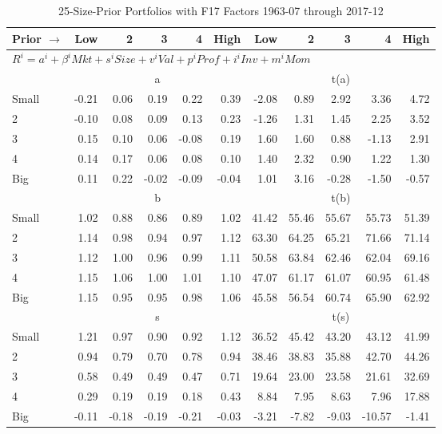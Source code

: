 
\begin{table}[!ht]
\footnotesize
\centering
\caption{25-Size-Prior Portfolios with F17 Factors 1963-07 through 2017-12}
\begin{tabular}{lrrrrrrrrrr}
  \toprule
    
    Prior $\rightarrow$ & Low & 2 & 3 & 4 & High & Low & 2 & 3 & 4 & High  \\ 
  \midrule
  \multicolumn{11}{l}{$R^i=a^i+\beta^iMkt+s^iSize+v^iVal+p^iProf+i^iInv+m^iMom$}  \\
  
     & \multicolumn{5}{c}{a} & \multicolumn{5}{c}{t(a)}   \\
     \cmidrule(r){2-6} \cmidrule(r){7-11} 
    Small  & -0.21  & 0.06  & 0.19  & 0.22  & 0.39  & -2.08  & 0.89  & 2.92  & 3.36  & 4.72   \\
    2  & -0.10  & 0.08  & 0.09  & 0.13  & 0.23  & -1.26  & 1.31  & 1.45  & 2.25  & 3.52   \\
    3  & 0.15  & 0.10  & 0.06  & -0.08  & 0.19  & 1.60  & 1.60  & 0.88  & -1.13  & 2.91   \\
    4  & 0.14  & 0.17  & 0.06  & 0.08  & 0.10  & 1.40  & 2.32  & 0.90  & 1.22  & 1.30   \\
    Big  & 0.11  & 0.22  & -0.02  & -0.09  & -0.04  & 1.01  & 3.16  & -0.28  & -1.50  & -0.57   \\
    
  
     & \multicolumn{5}{c}{b} & \multicolumn{5}{c}{t(b)}   \\
     \cmidrule(r){2-6} \cmidrule(r){7-11} 
    Small  & 1.02  & 0.88  & 0.86  & 0.89  & 1.02  & 41.42  & 55.46  & 55.67  & 55.73  & 51.39   \\
    2  & 1.14  & 0.98  & 0.94  & 0.97  & 1.12  & 63.30  & 64.25  & 65.21  & 71.66  & 71.14   \\
    3  & 1.12  & 1.00  & 0.96  & 0.99  & 1.11  & 50.58  & 63.84  & 62.46  & 62.04  & 69.16   \\
    4  & 1.15  & 1.06  & 1.00  & 1.01  & 1.10  & 47.07  & 61.17  & 61.07  & 60.95  & 61.48   \\
    Big  & 1.15  & 0.95  & 0.95  & 0.98  & 1.06  & 45.58  & 56.54  & 60.74  & 65.90  & 62.92   \\
    
  
     & \multicolumn{5}{c}{s} & \multicolumn{5}{c}{t(s)}   \\
     \cmidrule(r){2-6} \cmidrule(r){7-11} 
    Small  & 1.21  & 0.97  & 0.90  & 0.92  & 1.12  & 36.52  & 45.42  & 43.20  & 43.12  & 41.99   \\
    2  & 0.94  & 0.79  & 0.70  & 0.78  & 0.94  & 38.46  & 38.83  & 35.88  & 42.70  & 44.26   \\
    3  & 0.58  & 0.49  & 0.49  & 0.47  & 0.71  & 19.64  & 23.00  & 23.58  & 21.61  & 32.69   \\
    4  & 0.29  & 0.19  & 0.19  & 0.18  & 0.43  & 8.84  & 7.95  & 8.63  & 7.96  & 17.88   \\
    Big  & -0.11  & -0.18  & -0.19  & -0.21  & -0.03  & -3.21  & -7.82  & -9.03  & -10.57  & -1.41   \\
    

\end{tabular}
\end{table}
